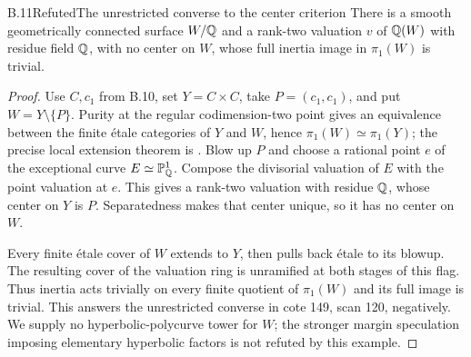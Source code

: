 \begin{statement}{B.11}{Refuted}{The unrestricted converse to the center criterion}
There is a smooth geometrically connected surface $W/\mathbb Q$ and a
rank-two valuation $v$ of $\mathbb Q(W)$ with residue field $\mathbb Q$, with
no center on $W$, whose full inertia image in $\pi_1(W)$ is trivial.
\end{statement}
\begin{proof}
Use $C,c_1$ from B.10, set $Y=C\times C$, take
$P=(c_1,c_1)$, and put $W=Y\setminus\{P\}$.
Purity at the regular codimension-two point gives an equivalence
between the finite \'etale categories of $Y$ and $W$, hence
$\pi_1(W)\simeq\pi_1(Y)$; the precise local extension theorem is
\cite[Lemma 58.21.3, Tag 0BJE]{BIR_Stacks}.
Blow up $P$ and choose a rational point $e$ of the exceptional
curve $E\simeq\mathbb P^1_\mathbb Q$.  Compose the divisorial valuation of $E$
with the point valuation at $e$.  This gives a rank-two valuation
with residue $\mathbb Q$, whose center on $Y$ is $P$.
Separatedness makes that center unique, so it has no center on $W$.

Every finite \'etale cover of $W$ extends to $Y$, then pulls back
\'etale to its blowup.  The resulting cover of the valuation ring
is unramified at both stages of this flag.  Thus inertia acts
trivially on every finite quotient of $\pi_1(W)$ and its full
image is trivial.  This answers the unrestricted converse in
cote 149, scan 120, negatively.  We supply no hyperbolic-polycurve
tower for $W$; the stronger margin speculation imposing elementary
hyperbolic factors is not refuted by this example.
\end{proof}

